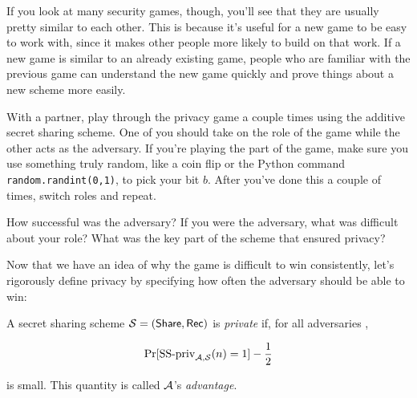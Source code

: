 If you look at many security games, though, you'll see that they are 
usually pretty similar to each other. This is because it's useful for a 
new game to be easy to work with, since it makes other people more likely 
to build on that work. If a new game is similar to an already existing game, 
people who are familiar with the previous game can understand the new game 
quickly and prove things about a new scheme more easily.

\begin{bonus}
    With a partner, play through the privacy game a couple times using the 
    additive secret sharing scheme. One of you should take on the role of the 
    game while the other acts as the adversary. If you're playing the part 
    of the game, make sure you use something truly random, like a coin 
    flip or the Python command \texttt{random.randint(0,1)}\footnotemark,
    to pick your bit $b$.
    After you've done this a couple of times, switch roles and repeat.

    How successful was the adversary? If you were the adversary, what was 
    difficult about your role? What was the key part of the scheme that 
    ensured privacy?
\end{bonus}

Now that we have an idea of why the game is difficult to win consistently, 
let's rigorously define privacy by specifying how often the adversary should 
be able to win: 

\begin{definition}
    A secret sharing scheme $\mathcal{S} = (\mathsf{Share},\allowbreak \mathsf{Rec})$ is \emph{private} if,
    for all 
    adversaries \A,

    \[
        \Pr[\textnormal{SS-priv}_{\mathcal{A},\mathcal{S}}(n) = 1] - \frac{1}{2}
    \]

    is small\footnotemark. This quantity is called $\mathcal{A}$'s \emph{advantage}.
\end{definition}

